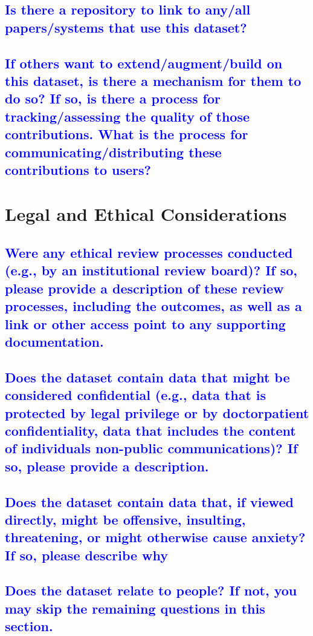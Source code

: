 \documentclass[letterpaper, 10 pt, conference]{ieeeconf}  %
\begin{document}
\textcolor{blue}{\subsection{Is there a repository to link to any/all papers/systems that use this dataset?}}
\lipsum[1]

\textcolor{blue}{\subsection{If others want to extend/augment/build on this
dataset, is there a mechanism for them to do so?
If so, is there a process for tracking/assessing the
quality of those contributions. What is the process
for communicating/distributing these contributions
to users?}}
\lipsum[1]

\section{Legal and Ethical Considerations}

\textcolor{blue}{\subsection{Were any ethical review processes conducted (e.g., by an institutional review board)? If so, please provide a description of these review
processes, including the outcomes, as well as a link or other access point
to any supporting documentation.}}
\lipsum[1]

\textcolor{blue}{\subsection{Does the dataset contain data that might be considered confidential
(e.g., data that is protected by legal privilege or by doctorpatient confidentiality, data that includes the content of individuals non-public
communications)? If so, please provide a description.}}
\lipsum[1]

\textcolor{blue}{\subsection{Does the dataset contain data that, if viewed directly, might be offensive, insulting, threatening, or might otherwise cause anxiety? If so,
please describe why}}
\lipsum[1]

\textcolor{blue}{\subsection{Does the dataset relate to people? If not, you may skip the remaining
questions in this section.}}
\lipsum[1]
\end{document}
